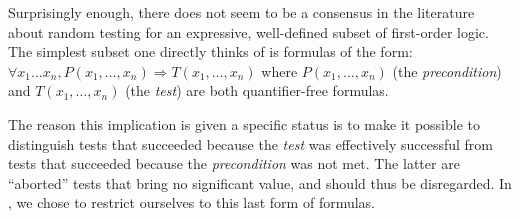Surprisingly enough, there does not seem to be a consensus in the
literature about random testing for an expressive, well-defined subset of
first-order logic. The simplest subset one directly thinks of is
formulas of the form:
$ \forall x_1 \dots x_n, P(x_1, \dots, x_n) \Rightarrow T(x_1, \dots,
x_n) $ where $P(x_1, \dots, x_n)$ (the \emph{precondition}) and
$T(x_1, \dots, x_n)$ (the \emph{test}) are both quantifier-free
formulas.

The reason this implication is given a specific status is to make it possible to
distinguish tests that succeeded because the \emph{test} was effectively
successful from tests that succeeded because the \emph{precondition} was not
met. The latter are ``aborted'' tests that bring no significant value, and
should thus be disregarded. In \arti, we chose to restrict ourselves to this
last form of formulas.
